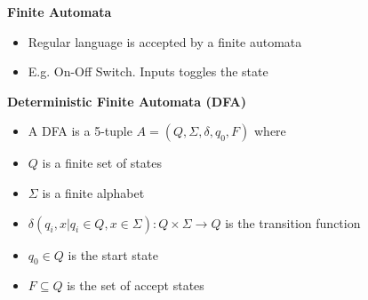 \documentclass[10pt, landscape]{article}
\begin{document}
\begin{multicols}{4}
\textbf{Finite Automata}
\begin{itemize}
  \item Regular language is accepted by a finite automata 
  \item E.g. On-Off Switch. Inputs toggles the state
\end{itemize}

\textbf{Deterministic Finite Automata (DFA)}
\begin{itemize}
  \item A DFA is a 5-tuple $A = (Q, \Sigma, \delta, q_0, F)$ where
  \item $Q$ is a finite set of states
  \item $\Sigma$ is a finite alphabet
  \item $\delta(q_i, x | q_i \in Q, x \in \Sigma): Q \times \Sigma \rightarrow Q$ is the transition function
  \item $q_0 \in Q$ is the start state
  \item $F \subseteq Q$ is the set of accept states
\end{itemize}



\end{multicols}
\end{document}
